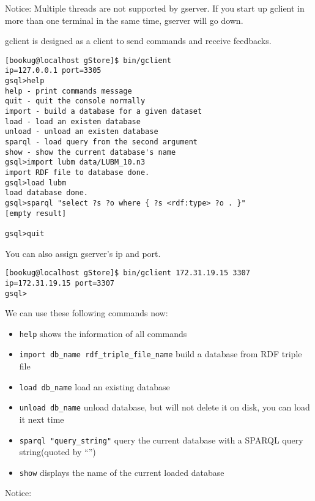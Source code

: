 \documentclass[titlepage, a4paper, 12pt]{article}
\begin{document}
Notice: Multiple threads are not supported by gserver. If you start up
gclient in more than one terminal in the same time, gserver will go
down.


gclient is designed as a client to send commands and receive feedbacks.

\begin{verbatim}
[bookug@localhost gStore]$ bin/gclient
ip=127.0.0.1 port=3305
gsql>help
help - print commands message
quit - quit the console normally
import - build a database for a given dataset
load - load an existen database
unload - unload an existen database
sparql - load query from the second argument
show - show the current database's name
gsql>import lubm data/LUBM_10.n3
import RDF file to database done.
gsql>load lubm
load database done.
gsql>sparql "select ?s ?o where { ?s <rdf:type> ?o . }"
[empty result]

gsql>quit
\end{verbatim}

You can also assign gserver's ip and port.

\begin{verbatim}
[bookug@localhost gStore]$ bin/gclient 172.31.19.15 3307
ip=172.31.19.15 port=3307
gsql>
\end{verbatim}

We can use these following commands now:

\begin{itemize}
\item
  \texttt{help} shows the information of all commands
\item
  \texttt{import\ db\_name\ rdf\_triple\_file\_name} build a database
  from RDF triple file
\item
  \texttt{load\ db\_name} load an existing database
\item
  \texttt{unload\ db\_name} unload database, but will not delete it on
  disk, you can load it next time
\item
  \texttt{sparql\ "query\_string"} query the current database with a
  SPARQL query string(quoted by ``'')
\item
  \texttt{show} displays the name of the current loaded database
\end{itemize}

Notice:
\end{document}
